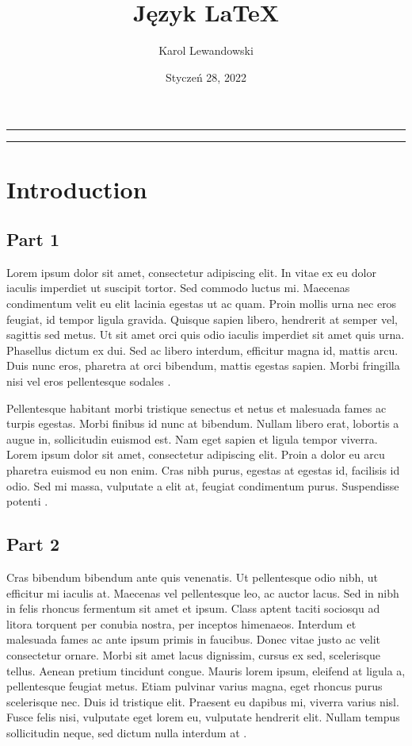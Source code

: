 \documentclass[a4paper, 12pt]{article}
\title{\Large{\textbf{Język LaTeX}}}
\author{Karol Lewandowski}
\date{Styczeń 28, 2022}
\begin{document}
\maketitle
\newpage

\rule{\textwidth}{0.5pt}
\begin{abstract}
	\noindent\blindtext[1]
\end{abstract}
\rule{\textwidth}{0.5pt}

\section{Introduction}
\subsection{Part 1}
Lorem ipsum dolor sit amet, consectetur adipiscing elit. In vitae ex eu dolor iaculis imperdiet ut suscipit tortor. Sed commodo luctus mi. Maecenas condimentum velit eu elit lacinia egestas ut ac quam. Proin mollis urna nec eros feugiat, id tempor ligula gravida. Quisque sapien libero, hendrerit at semper vel, sagittis sed metus. Ut sit amet orci quis odio iaculis imperdiet sit amet quis urna. Phasellus dictum ex dui. Sed ac libero interdum, efficitur magna id, mattis arcu. Duis nunc eros, pharetra at orci bibendum, mattis egestas sapien. Morbi fringilla nisi vel eros pellentesque sodales \cite{sherman1995article}.

Pellentesque habitant morbi tristique senectus et netus et malesuada fames ac turpis egestas. Morbi finibus id nunc at bibendum. Nullam libero erat, lobortis a augue in, sollicitudin euismod est. Nam eget sapien et ligula tempor viverra. Lorem ipsum dolor sit amet, consectetur adipiscing elit. Proin a dolor eu arcu pharetra euismod eu non enim. Cras nibh purus, egestas at egestas id, facilisis id odio. Sed mi massa, vulputate a elit at, feugiat condimentum purus. Suspendisse potenti \cite{otto1803article}.
\subsection{Part 2}
Cras bibendum bibendum ante quis venenatis. Ut pellentesque odio nibh, ut efficitur mi iaculis at. Maecenas vel pellentesque leo, ac auctor lacus. Sed in nibh in felis rhoncus fermentum sit amet et ipsum. Class aptent taciti sociosqu ad litora torquent per conubia nostra, per inceptos himenaeos. Interdum et malesuada fames ac ante ipsum primis in faucibus. Donec vitae justo ac velit consectetur ornare. Morbi sit amet lacus dignissim, cursus ex sed, scelerisque tellus. Aenean pretium tincidunt congue. Mauris lorem ipsum, eleifend at ligula a, pellentesque feugiat metus. Etiam pulvinar varius magna, eget rhoncus purus scelerisque nec. Duis id tristique elit. Praesent eu dapibus mi, viverra varius nisl. Fusce felis nisi, vulputate eget lorem eu, vulputate hendrerit elit. Nullam tempus sollicitudin neque, sed dictum nulla interdum at \cite{dirac}.
\end{document}
